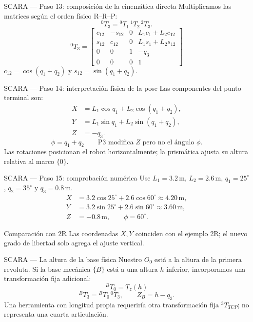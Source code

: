 \documentclass[aspectratio=169,11pt]{beamer}
\begin{document}
\begin{frame}[t]{SCARA — Paso 13: composición de la cinemática directa}
 \small
 Multiplicamos las matrices según el orden físico R--R--P:
 \[
 {}^0T_3={}^0T_1\,{}^1T_2\,{}^2T_3.
 \]
 \pause
 \[
 \boxed{{}^0T_3=\begin{bmatrix}
 c_{12}&-s_{12}&0&L_1c_1+L_2c_{12}\\
 s_{12}&c_{12}&0&L_1s_1+L_2s_{12}\\
 0&0&1&-q_3\\
 0&0&0&1
 \end{bmatrix}}
 \]
 \small $c_{12}=\cos(q_1+q_2)$ y $s_{12}=\sin(q_1+q_2)$.
\end{frame}

\begin{frame}[t]{SCARA — Paso 14: interpretación física de la pose}
 \small
 Las componentes del punto terminal son:
 \[
 \boxed{\begin{aligned}
 X&=L_1\cos q_1+L_2\cos(q_1+q_2),\\
 Y&=L_1\sin q_1+L_2\sin(q_1+q_2),\\
 Z&=-q_3.
 \end{aligned}}
 \]
 \pause
 \[
 \boxed{\phi=q_1+q_2}\qquad
 \boxed{\text{P3 modifica $Z$ pero no el ángulo $\phi$.}}
 \]
 \small Las rotaciones posicionan el robot horizontalmente;
 la prismática ajusta su altura relativa al marco $\{0\}$.
\end{frame}

\begin{frame}[t]{SCARA — Paso 15: comprobación numérica}
 \small
 Use $L_1=3.2\,\mathrm m$, $L_2=2.6\,\mathrm m$,
 $q_1=25^\circ$, $q_2=35^\circ$ y $q_3=0.8\,\mathrm m$.
 \pause
 \[
 \begin{aligned}
 X&=3.2\cos25^\circ+2.6\cos60^\circ\approx4.20\,\mathrm m,\\
 Y&=3.2\sin25^\circ+2.6\sin60^\circ\approx3.60\,\mathrm m,\\
 Z&=-0.8\,\mathrm m,\qquad\phi=60^\circ.
 \end{aligned}
 \]
 \begin{block}{Comparación con 2R}
 Las coordenadas $X,Y$ coinciden con el ejemplo 2R;
 el nuevo grado de libertad solo agrega el ajuste vertical.
 \end{block}
\end{frame}

\begin{frame}[t]{SCARA — La altura de la base física}
 \small
 Nuestro $O_0$ está a la altura de la primera revoluta.
 Si la base mecánica $\{B\}$ está a una altura $h$ inferior,
 incorporamos una transformación fija adicional:
 \[
 \boxed{{}^{B}T_0=T_z(h)}
 \]
 \pause
 \[
 \boxed{{}^{B}T_3={}^{B}T_0\,{}^0T_3,
 \qquad Z_B=h-q_3.}
 \]
 \small Una herramienta con longitud propia requeriría otra
 transformación fija ${}^3T_{TCP}$; no representa una cuarta articulación.
\end{frame}
\end{document}
